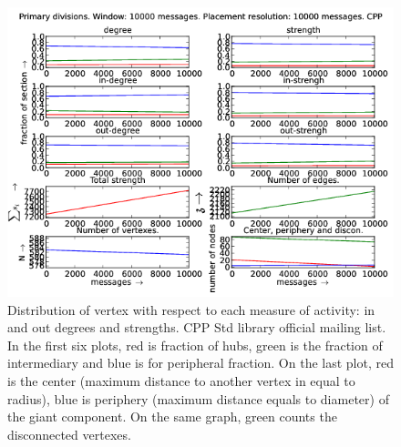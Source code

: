 \documentclass[%
 aip,
 jmp,%
 amsmath,amssymb,
 reprint,%
]{revtex4-1}
\begin{document}
\begin{figure}[hb]
   \centering
        \includegraphics[width=\textwidth]{figs/CPP/10000}
    \caption{Distribution of vertex with respect to each measure of activity: in and out degrees and strengths. CPP Std library official mailing list. In the first six plots, red is fraction of hubs, green is the fraction of intermediary and blue is for peripheral fraction. On the last plot, red is the center (maximum distance to another vertex in equal to radius), blue is periphery (maximum distance equals to diameter) of the giant component. On the same graph, green counts the disconnected vertexes.}
    \label{fig:cpp10000}
\end{figure}
\end{document}
